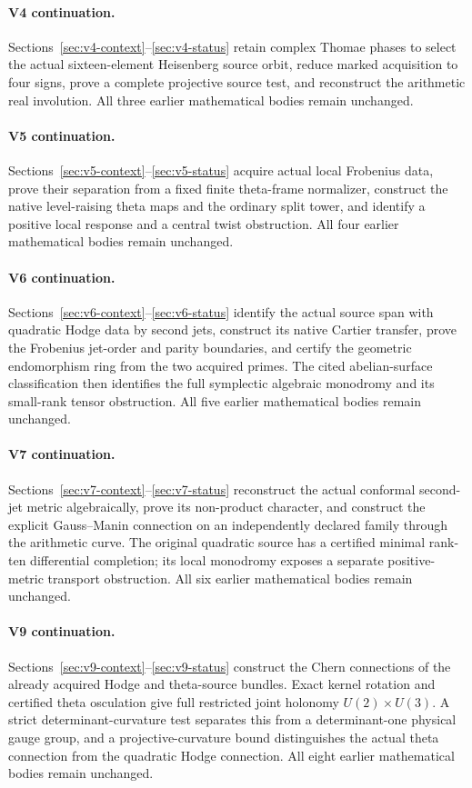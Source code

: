 \documentclass[11pt]{article}
\theoremstyle{definition}
\theoremstyle{remark}
\begin{document}
\paragraph{V4 continuation.}
Sections~\ref{sec:v4-context}--\ref{sec:v4-status} retain complex Thomae
phases to select the actual sixteen-element Heisenberg source orbit,
reduce marked acquisition to four signs, prove a complete projective
source test, and reconstruct the arithmetic real involution. All three
earlier mathematical bodies remain unchanged.
\paragraph{V5 continuation.}
Sections~\ref{sec:v5-context}--\ref{sec:v5-status} acquire actual local
Frobenius data, prove their separation from a fixed finite theta-frame
normalizer, construct the native level-raising theta maps and the ordinary
split tower, and identify a positive local response and a central twist
obstruction. All four earlier mathematical bodies remain unchanged.
\paragraph{V6 continuation.}
Sections~\ref{sec:v6-context}--\ref{sec:v6-status} identify the actual
source span with quadratic Hodge data by second jets, construct its native
Cartier transfer, prove the Frobenius jet-order and parity boundaries,
and certify the geometric endomorphism ring from the two acquired primes.
The cited abelian-surface classification then identifies the full symplectic
algebraic monodromy and its small-rank tensor obstruction.
All five earlier mathematical bodies remain unchanged.
\paragraph{V7 continuation.}
Sections~\ref{sec:v7-context}--\ref{sec:v7-status} reconstruct the
actual conformal second-jet metric algebraically, prove its non-product
character, and construct the explicit Gauss--Manin connection on an
independently declared family through the arithmetic curve. The original
quadratic source has a certified minimal rank-ten differential completion;
its local monodromy exposes a separate positive-metric transport obstruction.
All six earlier mathematical bodies remain unchanged.
\clearpage
\paragraph{V9 continuation.}
Sections~\ref{sec:v9-context}--\ref{sec:v9-status} construct the Chern
connections of the already acquired Hodge and theta-source bundles. Exact
kernel rotation and certified theta osculation give full restricted joint
holonomy $U(2)\times U(3)$. A strict determinant-curvature test separates
this from a determinant-one physical gauge group, and a projective-curvature
bound distinguishes the actual theta connection from the quadratic Hodge
connection. All eight earlier mathematical bodies remain unchanged.
\end{document}

